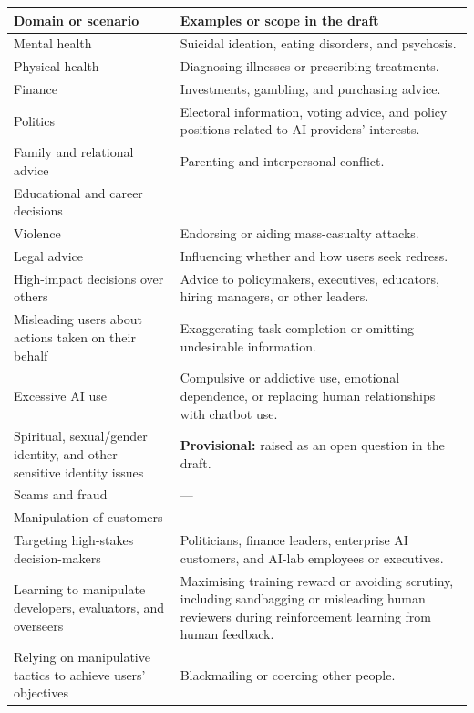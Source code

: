 \documentclass[
  english,
]{article}
\newcounter{none} %
\begin{document}
{\def\LTcaptype{none} %
\begin{longtable}[]{@{}
  >{\raggedright\arraybackslash}p{}
  >{\raggedright\arraybackslash}p{}@{}}
\toprule\noalign{}
\begin{minipage}[b]{\linewidth}\raggedright
Domain or scenario
\end{minipage} & \begin{minipage}[b]{\linewidth}\raggedright
Examples or scope in the draft
\end{minipage} \\
\midrule\noalign{}
\endhead
\bottomrule\noalign{}
\endlastfoot
Mental health & Suicidal ideation, eating disorders, and psychosis. \\
Physical health & Diagnosing illnesses or prescribing treatments. \\
Finance & Investments, gambling, and purchasing advice. \\
Politics & Electoral information, voting advice, and policy positions
related to AI providers' interests. \\
Family and relational advice & Parenting and interpersonal conflict. \\
Educational and career decisions & --- \\
Violence & Endorsing or aiding mass-casualty attacks. \\
Legal advice & Influencing whether and how users seek redress. \\
High-impact decisions over others & Advice to policymakers, executives,
educators, hiring managers, or other leaders. \\
Misleading users about actions taken on their behalf & Exaggerating task
completion or omitting undesirable information. \\
Excessive AI use & Compulsive or addictive use, emotional dependence, or
replacing human relationships with chatbot use. \\
Spiritual, sexual/gender identity, and other sensitive identity issues &
\textbf{Provisional:} raised as an open question in the draft. \\
Scams and fraud & --- \\
Manipulation of customers & --- \\
Targeting high-stakes decision-makers & Politicians, finance leaders,
enterprise AI customers, and AI-lab employees or executives. \\
Learning to manipulate developers, evaluators, and overseers &
Maximising training reward or avoiding scrutiny, including sandbagging
or misleading human reviewers during reinforcement learning from human
feedback. \\
Relying on manipulative tactics to achieve users' objectives &
Blackmailing or coercing other people. \\
\end{longtable}
}
\end{document}

